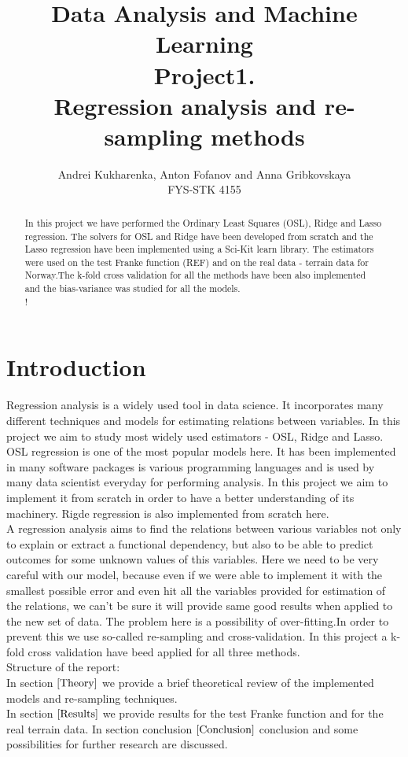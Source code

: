 \documentclass[10pt]{article}
\begin{document}
\setlength\parindent{1pt}
\title{Data Analysis and Machine Learning \\
Project1.\\ Regression analysis and re-sampling methods}
\author{Andrei Kukharenka, Anton Fofanov and Anna Gribkovskaya \\  
FYS-STK 4155 
}

\maketitle
\begin{abstract}
In this project we have performed the Ordinary Least Squares (OSL), Ridge and Lasso regression. The solvers for OSL and Ridge have been developed from scratch and the Lasso regression have been implemented using a Sci-Kit learn library. The estimators were used on the test Franke function (REF) and on the real data - terrain data for Norway.The k-fold cross validation for all the methods have been also implemented and the bias-variance was studied for all the models.\\!
\end{abstract}
\clearpage 


\section*{Introduction}
Regression analysis is a widely used tool in data science. It incorporates many different techniques and models for estimating relations between variables. In this project we aim to study most widely used estimators - OSL, Ridge and Lasso.
OSL regression is one of the most popular models here. It has been implemented in many software packages is various programming languages and is used by many data scientist everyday for performing analysis. In this project we aim to implement it from scratch in order to have a better understanding of its machinery. Rigde regression is also implemented from scratch here. \\
A regression analysis aims to find the relations between various variables not only to explain or extract a functional dependency, but also to be able to predict outcomes for some unknown values of this variables. Here we need to be very careful with our model, because even if we were able to implement it with the smallest possible error and even hit all the variables provided for estimation of the relations, we can't be sure it will provide same good results when applied to the new set of data. The problem here is a possibility of over-fitting.In order to prevent this we use so-called re-sampling and cross-validation. In this project a k-fold cross validation have beed applied for all three methods. \\
Structure of the report:\\
In section $\ref{Theory}$ we provide a brief theoretical review of the implemented models and re-sampling techniques.\\
In section $\ref{Results}$ we provide results for the test Franke function and for the real terrain data.
In section conclusion $\ref{Conclusion}$ conclusion and some possibilities for further research are discussed.
\end{document}
